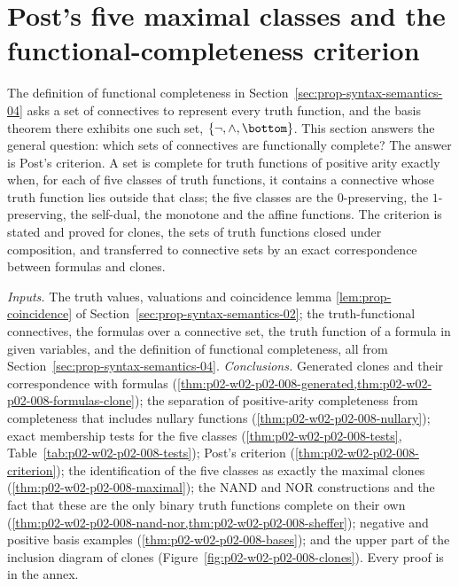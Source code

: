 \section{Post's five maximal classes and the functional-completeness criterion}
\label{sec:p02-w02-p02-008-post}

The definition of functional completeness in
Section~\ref{sec:prop-syntax-semantics-04} asks a set of connectives to
represent every truth function, and the basis theorem there exhibits one such
set, \(\{\neg,\land,\bottom\}\).  This section answers the general question:
which sets of connectives are functionally complete?  The answer is Post's
criterion.  A set is complete for truth functions of positive arity exactly
when, for each of five classes of truth functions, it contains a connective
whose truth function lies outside that class; the five classes are the
\(0\)-preserving, the \(1\)-preserving, the self-dual, the monotone and the
affine functions.  The criterion is stated and proved for clones, the sets of
truth functions closed under composition, and transferred to connective sets
by an exact correspondence between formulas and clones.

\emph{Inputs.}  The truth values, valuations and coincidence lemma
\cref{lem:prop-coincidence} of Section~\ref{sec:prop-syntax-semantics-02};
the truth-functional connectives, the formulas over a connective set, the
truth function of a formula in given variables, and the definition of
functional completeness, all from Section~\ref{sec:prop-syntax-semantics-04}.
\emph{Conclusions.}  Generated clones and their correspondence with formulas
(\cref{thm:p02-w02-p02-008-generated,thm:p02-w02-p02-008-formulas-clone});
the separation of positive-arity completeness from completeness that includes
nullary functions (\cref{thm:p02-w02-p02-008-nullary}); exact membership tests
for the five classes (\cref{thm:p02-w02-p02-008-tests},
Table~\ref{tab:p02-w02-p02-008-tests}); Post's criterion
(\cref{thm:p02-w02-p02-008-criterion}); the identification of the five classes
as exactly the maximal clones (\cref{thm:p02-w02-p02-008-maximal}); the
NAND and NOR constructions and the fact that these are the only binary truth
functions complete on their own
(\cref{thm:p02-w02-p02-008-nand-nor,thm:p02-w02-p02-008-sheffer}); negative
and positive basis examples (\cref{thm:p02-w02-p02-008-bases}); and the
upper part of the inclusion diagram of clones
(Figure~\ref{fig:p02-w02-p02-008-clones}).  Every proof is in the annex.

